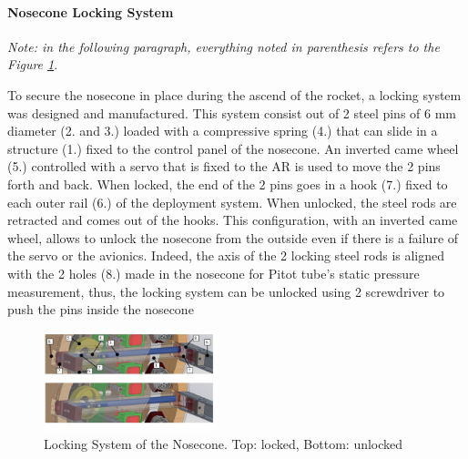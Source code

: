 \paragraph{Nosecone Locking System}
 \hfill \break
\textit{Note: in the following paragraph, everything noted in parenthesis refers to the Figure \ref{f:av_locking_sys}}.

To secure the nosecone in place during the ascend of the rocket, a locking system was designed and manufactured. This system consist out of 2 steel pins of 6 mm diameter (2. and 3.) loaded with a compressive spring (4.) that can slide in a structure (1.) fixed to the control panel of the nosecone. An inverted came wheel (5.) controlled with a servo that is fixed to the AR is used to move the 2 pins forth and back. When locked, the end of the 2 pins goes in a hook (7.) fixed to each outer rail (6.) of the
deployment system. When unlocked, the steel rods are retracted and comes out of the hooks. 
This configuration, with an inverted came wheel, allows to unlock the nosecone from the outside even if there is a failure of the servo or the avionics. Indeed, the axis of the 2 locking steel rods is aligned with the 2 holes (8.) made in the nosecone for Pitot tube's static pressure measurement, thus, the locking system can be unlocked using 2 screwdriver to push the pins inside the nosecone

  \begin{figure}[h!]
 	\centering
        \includegraphics[width=0.45\textwidth]{img/AV_FIG_CAD_lockingsystem_22.jpg}
        \caption{Locking System of the Nosecone. Top: locked, Bottom: unlocked}
        \label{f:av_locking_sys}
 \end{figure}

